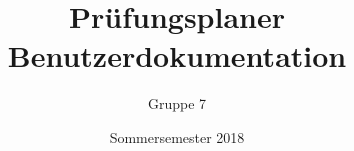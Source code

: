 \documentclass{scrartcl}
\begin{document}
	\tableofcontents
	
	\title{Prüfungsplaner \\ Benutzerdokumentation}
	\author{Gruppe 7}
	\date{Sommersemester 2018}
	\maketitle

	
	
\end{document}
